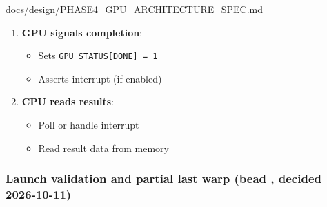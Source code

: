 \begin{relocated}{docs/design/PHASE4_GPU_ARCHITECTURE_SPEC.md}
\begin{enumerate}
  \begin{itemize}
  \tightlist
  \item
    Phase 4: runs the single block described by 
    (the grid registers are reserved, see "Phase 4 constraints"); a
    later phase iterates through all blocks in the grid
  \item
    Schedules the block\textquotesingle s warps round-robin
  \item
    Each warp executes until VRET
  \end{itemize}
\item
  \textbf{GPU signals completion}:

  \begin{itemize}
  \tightlist
  \item
    Sets \texttt{GPU\_\allowbreak{}STATUS[DONE]\ =\allowbreak{}\ 1}
  \item
    Asserts  interrupt (if enabled)
  \end{itemize}
\item
  \textbf{CPU reads results}:

  \begin{itemize}
  \tightlist
  \item
    Poll  or handle interrupt
  \item
    Read result data from memory
  \end{itemize}
\end{enumerate}

\subsubsection{\texorpdfstring{Launch validation and partial last warp
(bead , decided
2026-10-11)}{Launch validation and partial last warp (bead , decided 2026-10-11)}}\label{ds:ch:phase4-gpu-architecture:launch-validation-and-partial-last-warp-bead-6hy6-decided-2026-10-11}


\end{relocated}
